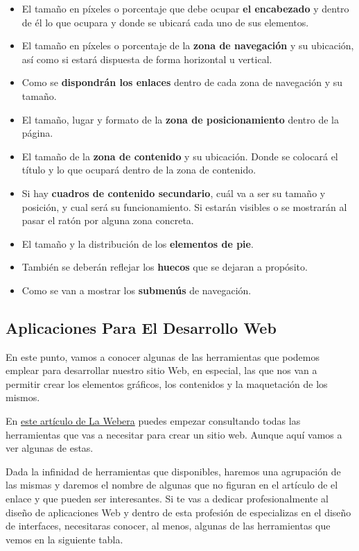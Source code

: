 \begin{itemize}
    \item El tamaño en píxeles o porcentaje que debe ocupar \textbf{el encabezado} y dentro de él lo que ocupara y donde se ubicará cada uno de sus elementos.
    \item El tamaño en píxeles o porcentaje de la \textbf{zona de navegación} y su ubicación, así como si estará dispuesta de forma horizontal u vertical.
    \item Como se \textbf{dispondrán los enlaces} dentro de cada zona de navegación y su tamaño.
    \item El tamaño, lugar y formato de la \textbf{zona de posicionamiento} dentro de la página.
    \item El tamaño de la \textbf{zona de contenido} y su ubicación. Donde se colocará el título y lo que ocupará dentro de la zona de contenido.
    \item Si hay \textbf{cuadros de contenido secundario}, cuál va a ser su tamaño y posición, y cual será su funcionamiento. Si estarán visibles o se mostrarán al pasar el ratón por alguna zona concreta.
    \item El tamaño y la distribución de los \textbf{elementos de pie}.
    \item También se deberán reflejar los \textbf{huecos} que se dejaran a propósito.
    \item Como se van a mostrar los \textbf{submenús} de navegación.
\end{itemize}

\subsection{Aplicaciones Para El Desarrollo Web}
En este punto, vamos a conocer algunas de las herramientas que podemos emplear para desarrollar nuestro sitio Web, en especial, las que nos van a permitir crear los elementos gráficos, los contenidos y la maquetación de los mismos.

En \href{https://www.lawebera.es/}{este artículo de La Webera} puedes empezar consultando todas las herramientas que vas a necesitar para crear un sitio web. Aunque aquí vamos a ver algunas de estas.

Dada la infinidad de herramientas que disponibles, haremos una agrupación de las mismas y daremos el nombre de algunas que no figuran en el artículo de el enlace y que pueden ser interesantes. Si te vas a dedicar profesionalmente al diseño de aplicaciones Web y dentro de esta profesión de especializas en el diseño de interfaces, necesitaras conocer, al menos, algunas de las herramientas que vemos en la siguiente tabla.

